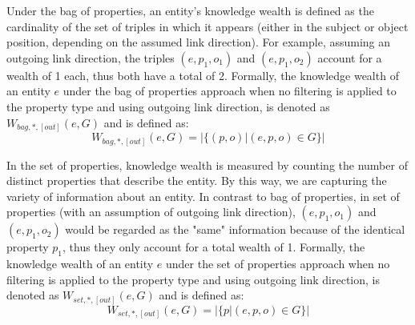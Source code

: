 Under the bag of properties, an entity's knowledge wealth is defined as the cardinality of the set of triples in which it appears (either in the subject or object position, depending on the assumed link direction). For example, assuming an outgoing link direction, the triples \((e, p_1, o_1)\) and \((e, p_1, o_2)\) account for a wealth of 1 each, thus both have a total of 2. Formally, the knowledge wealth of an entity \(e\) under the bag of properties approach when no filtering is applied to the property type and using outgoing link direction, is denoted as \(W_{bag, *, [out]}(e,G)\) and is defined as:
\[
    W_{bag, *, [out]}(e,G) = |\{(p, o) | (e, p, o) \in G\}|
\]

In the set of properties, knowledge wealth is measured by counting the number of distinct properties that describe the entity. By this way, we are capturing the variety of information about an entity. In contrast to bag of properties, in set of properties (with an assumption of outgoing link direction), \((e, p_1, o_1)\) and \((e, p_1, o_2)\) would be regarded as the "same" information because of the identical property \(p_1\), thus they only account for a total wealth of 1. Formally, the knowledge wealth of an entity \(e\) under the set of properties approach when no filtering is applied to the property type and using outgoing link direction, is denoted as \(W_{set, *, [out]}(e,G)\) and is defined as:
\[
    W_{set, *, [out]}(e,G) = |\{p | (e, p, o) \in G\}|
\]


